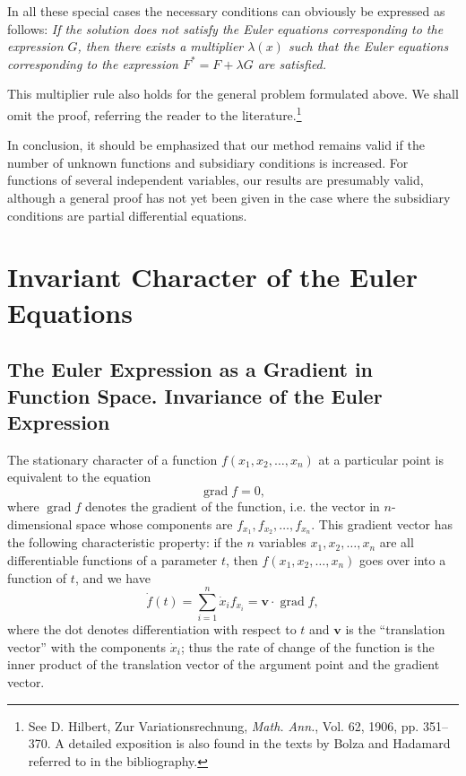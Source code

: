 In all these special cases the necessary conditions can obviously be expressed as follows: \emph{If the solution does not satisfy the Euler equations corresponding to the expression $G$, then there exists a multiplier $\lambda(x)$ such that the Euler equations corresponding to the expression $F^*=F+\lambda G$ are satisfied.}

This multiplier rule also holds for the general problem formulated above. We shall omit the proof, referring the reader to the literature.\footnote{See D. Hilbert, Zur Variationsrechnung, \emph{Math. Ann.}, Vol. 62, 1906, pp. 351--370. A detailed exposition is also found in the texts by Bolza and Hadamard referred to in the bibliography.}

In conclusion, it should be emphasized that our method remains valid if the number of unknown functions and subsidiary conditions is increased. For functions of several independent variables, our results are presumably valid, although a general proof has not yet been given in the case where the subsidiary conditions are partial differential equations.

\section{Invariant Character of the Euler Equations}
\subsection{The Euler Expression as a Gradient in Function Space. Invariance of the Euler Expression}
The stationary character of a function $f(x_1,x_2,\ldots,x_n)$ at a particular point is equivalent to the equation
\[
\operatorname{grad}f=0,
\]
where $\operatorname{grad}f$ denotes the gradient of the function, i.e. the vector in $n$-dimensional space whose components are $f_{x_1},f_{x_2},\ldots,f_{x_n}$. This gradient vector has the following characteristic property: if the $n$ variables $x_1,x_2,\ldots,x_n$ are all differentiable functions of a parameter $t$, then $f(x_1,x_2,\ldots,x_n)$ goes over into a function of $t$, and we have
\begin{equation}\tag{57}
\dot f(t)=\sum_{i=1}^n\dot x_i f_{x_i}=\mathbf v\cdot\operatorname{grad}f,
\end{equation}
where the dot denotes differentiation with respect to $t$ and $\mathbf v$ is the ``translation vector'' with the components $\dot x_i$; thus the rate of change of the function is the inner product of the translation vector of the argument point and the gradient vector.

